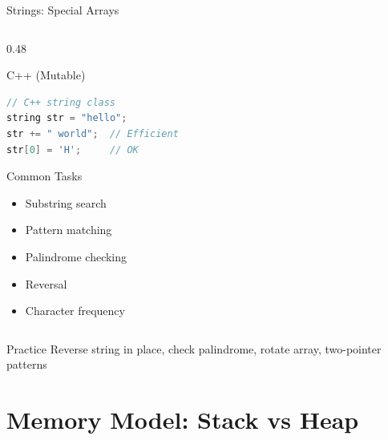 \documentclass[aspectratio=169,xcolor=dvipsnames]{beamer}
\begin{document}
\begin{frame}[fragile]{Strings: Special Arrays}
\begin{columns}
\begin{column}{0.48\textwidth}
\begin{exampleblock}{C++ (Mutable)}
\begin{lstlisting}[language=C++,basicstyle=\tiny\ttfamily]
// C++ string class
string str = "hello";
str += " world";  // Efficient
str[0] = 'H';     // OK
        \end{lstlisting}
      \end{exampleblock}

      \vspace{0.2cm}

      \begin{alertblock}{Common Tasks}
        \begin{itemize}
          \item Substring search
          \item Pattern matching
          \item Palindrome checking
          \item Reversal
          \item Character frequency
        \end{itemize}
      \end{alertblock}
    \end{column}
  \end{columns}

  \vspace{0.3cm}

  \begin{block}{Practice}
    Reverse string in place, check palindrome, rotate array, two-pointer patterns
  \end{block}
\end{frame}

\section{Memory Model: Stack vs Heap}
\end{document}
